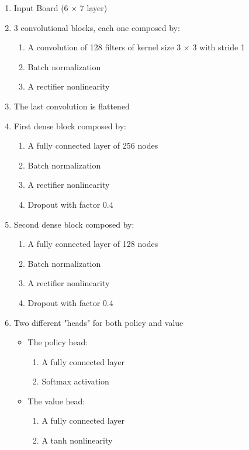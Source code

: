 \documentclass{article}
\begin{document}
\begin{enumerate}
	\item Input Board (6 $\times$ 7 layer)
	
	\item 3 convolutional blocks, each one composed by:
	\begin{enumerate}
		\item A convolution of 128 filters of kernel size 3 $\times$ 3 with stride 1
		\item Batch normalization
		\item A rectifier nonlinearity
	\end{enumerate}
	
	\item The last convolution is flattened
	\item First dense block composed by:
	\begin{enumerate}
		\item A fully connected layer of 256 nodes
		\item Batch normalization
		\item A rectifier nonlinearity
		\item Dropout with factor $0.4$
	\end{enumerate}
	
	\item Second dense block composed by:
	\begin{enumerate}
		\item A fully connected layer of 128 nodes
		\item Batch normalization
		\item A rectifier nonlinearity
		\item Dropout with factor $0.4$
	\end{enumerate}

	\item Two different "heads" for both policy and value
	\begin{itemize}
		\item The policy head:
		\begin{enumerate}
			\item A fully connected layer
			\item Softmax activation
		\end{enumerate}
		
		\item The value head:
		\begin{enumerate}
			\item A fully connected layer
			\item A tanh nonlinearity
		\end{enumerate}
	\end{itemize}

\end{enumerate}
\end{document}
